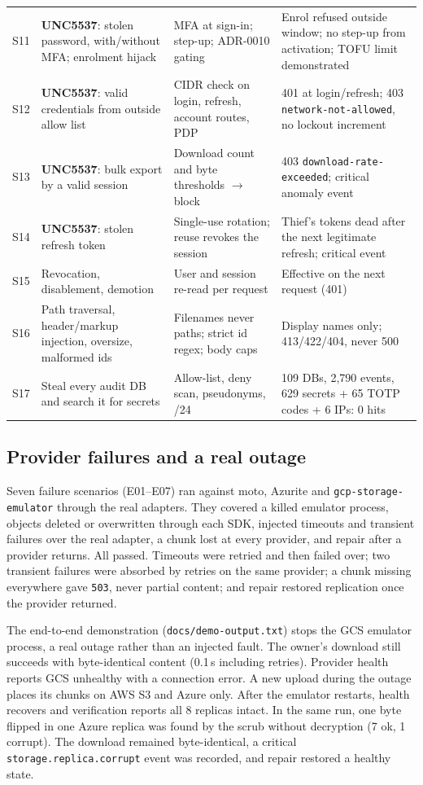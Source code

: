 \documentclass[conference]{IEEEtran}
\newcommand{\code}[1]{\texttt{\small #1}}
\begin{document}
\begin{table}[t]
\begin{tabularx}{\textwidth}{@{}P{0.5cm}P{4.1cm}P{5.1cm}L@{}}
S11 & \textbf{UNC5537}: stolen password, with/without MFA; enrolment hijack & MFA at sign-in; step-up; ADR-0010 gating & Enrol refused outside window; no step-up from activation; TOFU limit demonstrated \\
S12 & \textbf{UNC5537}: valid credentials from outside allow list & CIDR check on login, refresh, account routes, PDP & 401 at login/refresh; 403 \code{network-not-allowed}, no lockout increment \\
S13 & \textbf{UNC5537}: bulk export by a valid session & Download count and byte thresholds $\rightarrow$ block & 403 \code{download-rate-exceeded}; critical anomaly event \\
S14 & \textbf{UNC5537}: stolen refresh token & Single-use rotation; reuse revokes the session & Thief's tokens dead after the next legitimate refresh; critical event \\
S15 & Revocation, disablement, demotion & User and session re-read per request & Effective on the next request (401) \\
S16 & Path traversal, header/markup injection, oversize, malformed ids & Filenames never paths; strict id regex; body caps & Display names only; 413/422/404, never 500 \\
S17 & Steal every audit DB and search it for secrets & Allow-list, deny scan, pseudonyms, /24 & 109 DBs, 2,790 events, 629 secrets + 65 TOTP codes + 6 IPs: 0 hits \\
\bottomrule
\end{tabularx}
\end{table}

\subsection{Provider failures and a real outage}
Seven failure scenarios (E01--E07) ran against moto, Azurite and \code{gcp-storage-emulator} through the real adapters. They covered a killed emulator process, objects deleted or overwritten through each SDK, injected timeouts and transient failures over the real adapter, a chunk lost at every provider, and repair after a provider returns. All passed. Timeouts were retried and then failed over; two transient failures were absorbed by retries on the same provider; a chunk missing everywhere gave \code{503}, never partial content; and repair restored replication once the provider returned.

The end-to-end demonstration (\code{docs/demo-output.txt}) stops the GCS emulator process, a real outage rather than an injected fault. The owner's download still succeeds with byte-identical content (0.1\,s including retries). Provider health reports GCS unhealthy with a connection error. A new upload during the outage places its chunks on AWS S3 and Azure only. After the emulator restarts, health recovers and verification reports all 8 replicas intact. In the same run, one byte flipped in one Azure replica was found by the scrub without decryption (7 ok, 1 corrupt). The download remained byte-identical, a critical \code{storage.replica.corrupt} event was recorded, and repair restored a healthy state.
\end{document}
